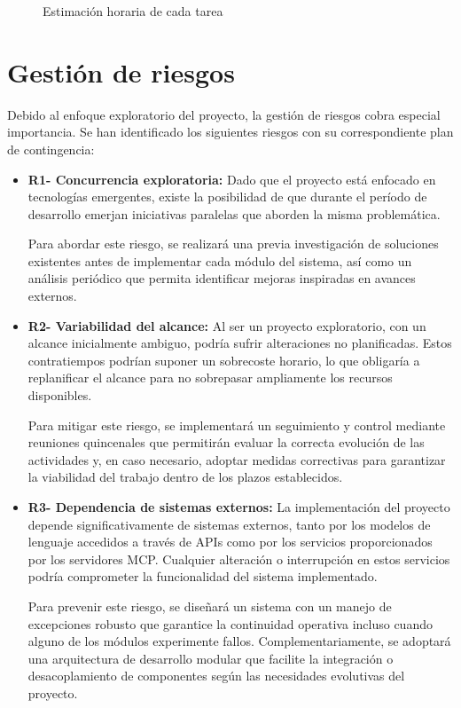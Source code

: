 \begin{figure}[h]
  \centering
  \caption{Estimación horaria de cada tarea}
  \label{fig:horas}
\end{figure}

\section{Gestión de riesgos}

Debido al enfoque exploratorio del proyecto, la gestión de riesgos cobra especial importancia. Se han identificado los siguientes riesgos con su correspondiente plan de contingencia: 

\begin{itemize}
  \item\textbf{R1- Concurrencia exploratoria: }Dado que el proyecto está enfocado en tecnologías emergentes, existe la posibilidad de que durante el período de desarrollo emerjan iniciativas paralelas que aborden la misma problemática.  

Para abordar este riesgo, se realizará una previa investigación de soluciones existentes antes de implementar cada módulo del sistema, así como un análisis periódico que permita identificar mejoras inspiradas en avances externos.

\item\textbf{R2- Variabilidad del alcance: }Al ser un proyecto exploratorio, con un alcance inicialmente ambiguo, podría sufrir alteraciones no planificadas. Estos contratiempos podrían suponer un sobrecoste horario, lo que obligaría a replanificar el alcance para no sobrepasar ampliamente los recursos disponibles.

Para mitigar este riesgo, se implementará un seguimiento y control mediante reuniones quincenales que permitirán evaluar la correcta evolución de las actividades y, en caso necesario, adoptar medidas correctivas para garantizar la viabilidad del trabajo dentro de los plazos establecidos.


\item\textbf{R3- Dependencia de sistemas externos: }La implementación del proyecto depende significativamente de sistemas externos, tanto por los modelos de lenguaje accedidos a través de APIs como por los servicios proporcionados por los servidores MCP. Cualquier alteración o interrupción en estos servicios podría comprometer la funcionalidad del sistema implementado.

Para prevenir este riesgo, se diseñará un sistema con un manejo de excepciones robusto que garantice la continuidad operativa incluso cuando alguno de los módulos experimente fallos. Complementariamente, se adoptará una arquitectura de desarrollo modular que facilite la integración o desacoplamiento de componentes según las necesidades evolutivas del proyecto.


\end{itemize}
